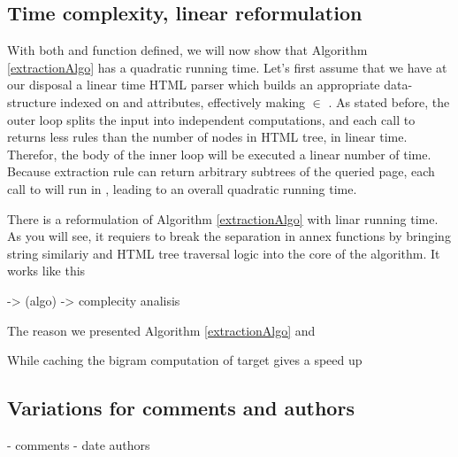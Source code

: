 \similarityAlgo

\subsection{Time complexity, linear reformulation}

With both  and  function defined, we will now show that Algorithm \ref{extractionAlgo} has a quadratic running time. Let's first assume that we have at our disposal a linear time HTML parser which builds an appropriate data-structure indexed on  and  attributes, effectively making  $\in$ . As stated before, the outer loop splits the input into independent computations, and each call to  returns less rules than the number of nodes in HTML tree, in linear time. Therefor, the body of the inner loop will be executed a linear number of time. Because extraction rule can return arbitrary subtrees of the queried page, each call to  will run in , leading to an overall quadratic running time.

There is a reformulation of Algorithm \ref{extractionAlgo} with linar running time. As you will see, it requiers to break the separation in annex functions by bringing string similariy and HTML tree traversal logic into the core of the algorithm. It works like this

\linearAlgo

-> (algo)
-> complecity analisis

The reason we presented Algorithm \ref{extractionAlgo} and 

While caching the bigram computation of target gives a speed up


\subsection{Variations for comments and authors}
- comments
- date authors
